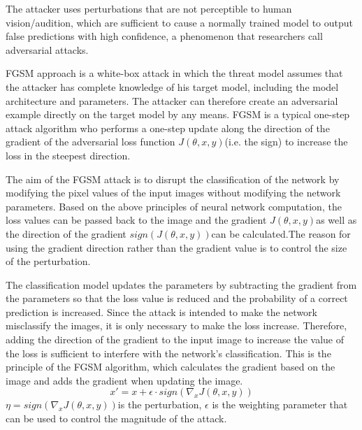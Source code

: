 

The attacker uses perturbations that are not perceptible to human vision/audition, which are sufficient to cause a normally trained model to output false predictions with high confidence, a phenomenon that researchers call adversarial attacks.

FGSM approach is a white-box attack in which the threat model assumes that the attacker has complete knowledge of his target model, including the model architecture and parameters. The attacker can therefore create an adversarial example directly on the target model by any means. FGSM is a typical one-step attack algorithm who performs a one-step update along the direction of the gradient of the adversarial loss function $J(\theta, x, y)$(i.e. the sign) to increase the loss in the steepest direction.

The aim of the FGSM attack is to disrupt the classification of the network by modifying the pixel values of the input images without modifying the network parameters. Based on the above principles of neural network computation, the loss values can be passed back to the image and the gradient $J(\theta, x, y)$as well as the direction of the gradient $sign(J(\theta, x, y))$can be calculated.The reason for using the gradient direction rather than the gradient value is to control the size of the perturbation.

The classification model updates the parameters by subtracting the gradient from the parameters so that the loss value is reduced and the probability of a correct prediction is increased. Since the attack is intended to make the network misclassify the images, it is only necessary to make the loss increase. Therefore, adding the direction of the gradient to the input image to increase the value of the loss is sufficient to interfere with the network's classification. This is the principle of the FGSM algorithm, which calculates the gradient based on the image and adds the gradient when updating the image.
\begin{equation}
    x' = x + \epsilon \cdot sign(\nabla_{x}J(\theta, x, y))
\end{equation}
$\eta = sign(\nabla_{x}J(\theta, x, y))$is the perturbation, $\epsilon$ is the weighting parameter that can be used to control the magnitude of the attack. 